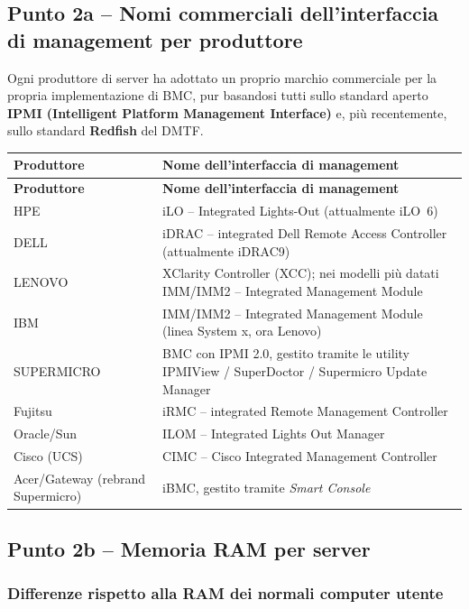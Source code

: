 \documentclass[11pt,a4paper]{article}
\begin{document}
\subsection{Punto 2a -- Nomi commerciali dell'interfaccia di management per produttore}

Ogni produttore di server ha adottato un proprio marchio commerciale per la propria implementazione di BMC, pur basandosi tutti sullo standard aperto \textbf{IPMI (Intelligent Platform Management Interface)} e, più recentemente, sullo standard \textbf{Redfish} del DMTF.

\begin{center}
\begin{longtable}{p{3.5cm}p{10.5cm}}
\toprule
\textbf{Produttore} & \textbf{Nome dell'interfaccia di management} \\
\midrule
\endfirsthead
\toprule
\textbf{Produttore} & \textbf{Nome dell'interfaccia di management} \\
\midrule
\endhead
HPE & iLO -- Integrated Lights-Out (attualmente iLO~6) \\
DELL & iDRAC -- integrated Dell Remote Access Controller (attualmente iDRAC9) \\
LENOVO & XClarity Controller (XCC); nei modelli più datati IMM/IMM2 -- Integrated Management Module \\
IBM & IMM/IMM2 -- Integrated Management Module (linea System x, ora Lenovo) \\
SUPERMICRO & BMC con IPMI 2.0, gestito tramite le utility IPMIView / SuperDoctor / Supermicro Update Manager \\
Fujitsu & iRMC -- integrated Remote Management Controller \\
Oracle/Sun & ILOM -- Integrated Lights Out Manager \\
Cisco (UCS) & CIMC -- Cisco Integrated Management Controller \\
Acer/Gateway (rebrand Supermicro) & iBMC, gestito tramite \emph{Smart Console} \\
\bottomrule
\end{longtable}
\end{center}

\subsection{Punto 2b -- Memoria RAM per server}

\subsubsection{Differenze rispetto alla RAM dei normali computer utente}
\end{document}
